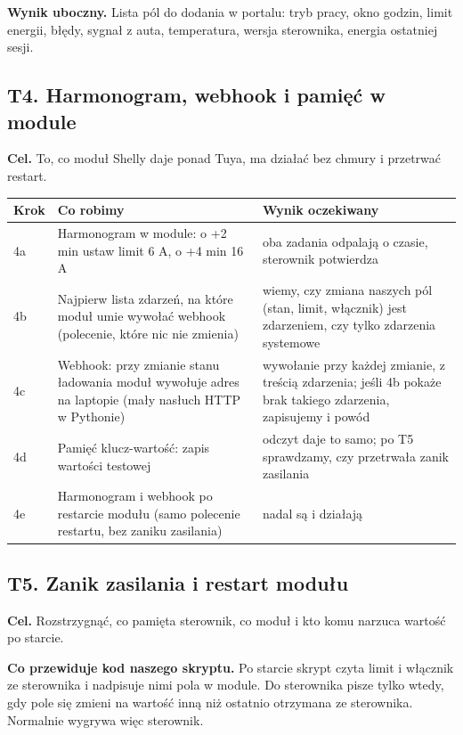 \documentclass[11pt,a4paper]{article}
\begin{document}
\textbf{Wynik uboczny.} Lista pól do dodania w portalu: tryb pracy, okno godzin, limit energii, błędy, sygnał z auta, temperatura, wersja sterownika, energia ostatniej sesji.


\subsection{T4. Harmonogram, webhook i pamięć w module}

\textbf{Cel.} To, co moduł Shelly daje ponad Tuya, ma działać bez chmury i przetrwać restart.


\begin{longtable}{>{\raggedright\arraybackslash}p{3.00cm}>{\raggedright\arraybackslash}p{6.14cm}>{\raggedright\arraybackslash}p{6.14cm}}
\toprule
\rowcolor{apteallight}\textbf{Krok} & \textbf{Co robimy} & \textbf{Wynik oczekiwany} \\
\midrule\endhead
\bottomrule\endfoot
4a & Harmonogram w module: o +2 min ustaw limit 6 A, o +4 min 16 A & oba zadania odpalają o czasie, sterownik potwierdza \\
4b & Najpierw lista zdarzeń, na które moduł umie wywołać webhook (polecenie, które nic nie zmienia) & wiemy, czy zmiana naszych pól (stan, limit, włącznik) jest zdarzeniem, czy tylko zdarzenia systemowe \\
4c & Webhook: przy zmianie stanu ładowania moduł wywołuje adres na laptopie (mały nasłuch HTTP w Pythonie) & wywołanie przy każdej zmianie, z treścią zdarzenia; jeśli 4b pokaże brak takiego zdarzenia, zapisujemy \leavevmode{\symbolfont\color{apred}\textbf{✘}} i powód \\
4d & Pamięć klucz-wartość: zapis wartości testowej & odczyt daje to samo; po T5 sprawdzamy, czy przetrwała zanik zasilania \\
4e & Harmonogram i webhook po restarcie modułu (samo polecenie restartu, bez zaniku zasilania) & nadal są i działają \\
\end{longtable}

\subsection{T5. Zanik zasilania i restart modułu}

\textbf{Cel.} Rozstrzygnąć, co pamięta sterownik, co moduł i kto komu narzuca wartość po starcie.


\textbf{Co przewiduje kod naszego skryptu.} Po starcie skrypt czyta limit i włącznik ze sterownika i nadpisuje nimi pola w module. Do sterownika pisze tylko wtedy, gdy pole się zmieni na wartość inną niż ostatnio otrzymana ze sterownika. Normalnie wygrywa więc sterownik.
\end{document}
